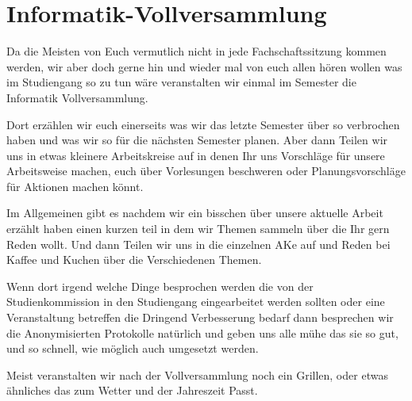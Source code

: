 
\section{Informatik-Vollversammlung}

Da die Meisten von Euch vermutlich nicht in jede Fachschaftssitzung kommen werden, wir aber doch gerne hin und wieder mal von euch allen hören wollen was im Studiengang so zu tun wäre veranstalten wir einmal im Semester die Informatik Vollversammlung.

Dort erzählen wir euch einerseits was wir das letzte Semester über so verbrochen haben und was wir so für die nächsten Semester planen. Aber dann Teilen wir uns in etwas kleinere Arbeitskreise auf in denen Ihr uns Vorschläge für unsere Arbeitsweise machen, euch über Vorlesungen beschweren oder Planungsvorschläge für Aktionen machen könnt.

Im Allgemeinen gibt es nachdem wir ein bisschen über unsere aktuelle Arbeit erzählt haben einen kurzen teil in dem wir Themen sammeln über die Ihr gern Reden wollt. Und dann Teilen wir uns in die einzelnen AKe auf und Reden bei Kaffee und Kuchen über die Verschiedenen Themen.

Wenn dort irgend welche Dinge besprochen werden die von der Studienkommission in den Studiengang eingearbeitet werden sollten oder eine Veranstaltung betreffen die Dringend Verbesserung bedarf dann besprechen wir die Anonymisierten Protokolle natürlich und geben uns alle mühe das sie so gut, und so schnell, wie möglich auch umgesetzt werden.

Meist veranstalten wir nach der Vollversammlung noch ein Grillen, oder etwas ähnliches das zum Wetter und der Jahreszeit Passt.
